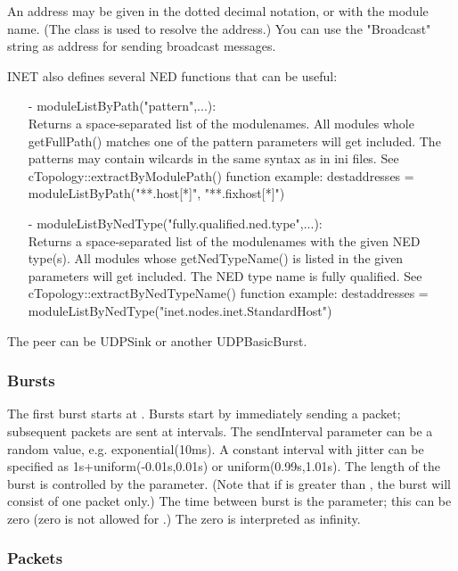 An address may be given in the dotted decimal notation, or with the module 
name. (The  class is used to resolve the address.)
You can use the "Broadcast" string as address for sending broadcast messages.

INET also defines several NED functions that can be useful: 
\begin{itemize}
\item[-] moduleListByPath("pattern",...): \\
         Returns a space-separated list of the modulenames.
         All modules whole getFullPath() matches one of the pattern parameters will get included.
         The patterns may contain wilcards in the same syntax as in ini files.
         See cTopology::extractByModulePath() function
         example: destaddresses = moduleListByPath("**.host[*]", "**.fixhost[*]")
\item[-] moduleListByNedType("fully.qualified.ned.type",...): \\ 
         Returns a space-separated list of the modulenames with the given NED type(s).
         All modules whose getNedTypeName() is listed in the given parameters will get included.
         The NED type name is fully qualified.
         See cTopology::extractByNedTypeName() function
         example: destaddresses = moduleListByNedType("inet.nodes.inet.StandardHost")
\end{itemize}

The peer can be UDPSink or another UDPBasicBurst.

\subsubsection*{Bursts}

The first burst starts at . Bursts start by immediately sending 
a packet; subsequent packets are sent at  intervals. The 
sendInterval parameter can be a random value, e.g. exponential(10ms).
A constant interval with jitter can be specified as 1s+uniform(-0.01s,0.01s)
or uniform(0.99s,1.01s). The length of the burst is controlled by the
 parameter. (Note that if  is greater than 
, the burst will consist of one packet only.) The time between
burst is the  parameter; this can be zero (zero is not
allowed for .) The zero  is interpreted as infinity.

\subsubsection*{Packets}

